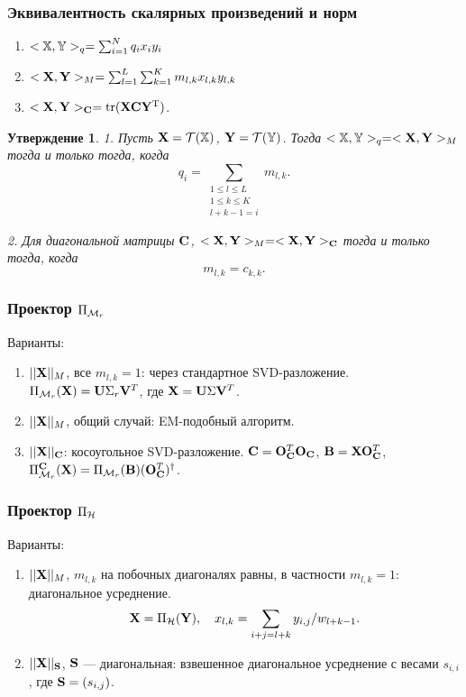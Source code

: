 \documentclass[unicode, notheorems]{beamer}
\newtheorem{proposition}{Утверждение}
\begin{document}
\begin{frame}
	\frametitle{Эквивалентность скалярных произведений и норм}
	
	\begin{enumerate}
		\item $<\mathbb{X}, \mathbb{Y}>_q = \sum_{i=1}^N q_i x_i  y_i$
		\item $<\mathbf{X}, \mathbf{Y}>_M = \sum_{l = 1}^L \sum_{k = 1}^K m_{l, k} x_{l, k} y_{l, k}$
		\item $<\mathbf{X}, \mathbf{Y}>_{\mathbf{C}} = \text{tr}(\mathbf{X} \mathbf{C} \mathbf{Y}^{\mathrm{T}})$.
	\end{enumerate}
	\begin{proposition}
		1. Пусть $\mathbf{X} = \mathcal{T}(\mathbb{X})$,  $\mathbf{Y} = \mathcal{T}(\mathbb{Y})$. Тогда $<\mathbb{X},\mathbb{Y}>_q= <\mathbf{X},\mathbf{Y}>_M$ тогда и только тогда, когда
		\begin{equation*}
		q_i = \sum_{\substack{1 \le l \le L \\ 1 \le k \le K \\ l+k-1=i}} m_{l,k}.
		\end{equation*}
		
		2. Для диагональной матрицы $\mathbf{C}$, $<\mathbf{X},\mathbf{Y}>_M= <\mathbf{X},\mathbf{Y}>_{\mathbf{C}}$ тогда и только тогда, когда
		\begin{equation*}
		m_{l,k}=c_{k,k}.
		\end{equation*}
	\end{proposition}
	
\end{frame}

\begin{frame}
	\frametitle{Проектор $\Pi_{\mathcal{M}_r}$}
	Варианты:
	\begin{enumerate}
		\item $||\mathbf{X}||_M$, все $m_{l, k} = 1$: через стандартное SVD-разложение. $\Pi_{\mathcal{M}_r}(\mathbf{X}) = \mathbf{U} \Sigma_r \mathbf{V}^T$, где $\mathbf{X} = \mathbf{U} \Sigma \mathbf{V}^T$.
		\vspace{0.2cm}
		\item $||\mathbf{X}||_M$, общий случай: EM-подобный алгоритм.
		\vspace{0.2cm}
		\item $||\mathbf{X}||_{\mathbf{C}}$: косоугольное SVD-разложение. $\mathbf{C} = \mathbf{O}_{\mathbf{C}}^T \mathbf{O}_{\mathbf{C}}$, $\mathbf{B} = \mathbf{X} \mathbf{O}_{\mathbf{C}}^T$, $\Pi_{\mathcal{M}_r}^{\mathbf{C}}(\mathbf{X}) = \Pi_{\mathcal{M}_r}(\mathbf{B})(\mathbf{O}_{\mathbf{C}}^T)^\dagger$.
	\end{enumerate}
\end{frame}

\begin{frame}
	\frametitle{Проектор $\Pi_{\mathcal{H}}$}
	Варианты:
	\begin{enumerate}
		\item $||\mathbf{X}||_M$, $m_{l,k}$ на побочных диагоналях равны, в частности $m_{l, k} = 1$: диагональное усреднение.
		\begin{equation*}
		\mathbf{X} = \Pi_{\mathcal{H}}(\mathbf{Y}), \quad x_{l,k} = \sum_{i + j = l + k} y_{i, j} / w_{l + k - 1}.
		\end{equation*}
		\item $||\mathbf{X}||_{\mathbf{S}}$, $\mathbf{S}$ --- диагональная: взвешенное диагональное усреднение с весами $s_{i, i}$, где $\mathbf{S} = (s_{i, j})$.
	\end{enumerate}
\end{frame}
\end{document}
